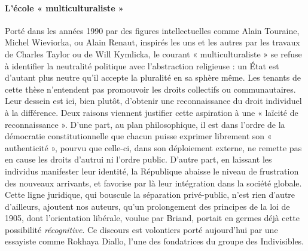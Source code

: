 \paragraph{L’école « multiculturaliste »} Porté dans les années 1990 par des figures intellectuelles comme Alain Touraine, Michel Wieviorka, ou Alain Renaut, inspirés les uns et les autres par les travaux de Charles Taylor ou de Will Kymlicka, le courant « multiculturaliste » se refuse à identifier la neutralité politique avec l’abstraction religieuse : un État est d’autant plus neutre qu’il accepte la pluralité en sa sphère même. Les tenants de cette thèse n’entendent pas promouvoir les droits collectifs ou communautaires. Leur dessein est ici, bien plutôt, d’obtenir une reconnaissance du droit individuel à la différence. Deux raisons viennent justifier cette aspiration à une « laïcité de reconnaissance  ». D’une part, au plan philosophique, il est dans l’ordre de la démocratie constitutionnelle que chacun puisse exprimer librement son « authenticité », pourvu que celle-ci, dans son déploiement externe, ne remette pas en cause les droits d’autrui ni l’ordre public. D’autre part, en laissant les individus manifester leur identité, la République abaisse le niveau de frustration des nouveaux arrivants, et favorise par là leur intégration dans la société globale. Cette ligne juridique, qui bouscule la séparation privé-public, n’est rien d’autre d’ailleurs, ajoutent nos auteurs, qu’un prolongement des principes de la loi de 1905, dont l’orientation libérale,
 voulue par Briand, portait en germes déjà cette possibilité \textit{récognitive}. Ce discours est volontiers porté aujourd’hui par une essayiste comme Rokhaya Diallo, l’une des fondatrices du groupe des Indivisibles.

